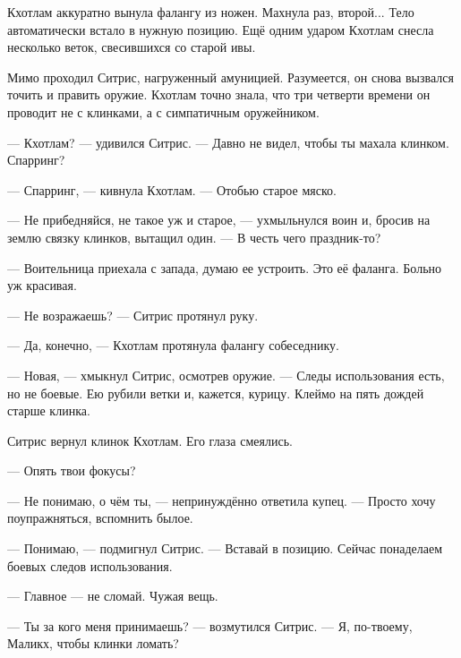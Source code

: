 \documentclass[a4paper,10pt,fleqn]{book}\usepackage{cooltooltips}\usepackage{polyglossia}\setdefaultlanguage{english}\setotherlanguage{russian}\defaultfontfeatures{Ligatures=TeX,Mapping=tex-text} \usepackage{xcolor}\definecolor{lightgray}{HTML}{bbbbbb}\color{lightgray}\newcommand{\ml}[3]{\textcolor{black}{#3}}
\newcommand{\asterism}{\vspace{1em}{\centering\Large\bfseries$\ast~\ast~\ast$\par}\vspace{1em}}
\begin{document}
\asterism

Кхотлам аккуратно вынула фалангу из ножен.
Махнула раз, второй...
Тело автоматически встало в нужную позицию.
Ещё одним ударом Кхотлам снесла несколько веток, свесившихся со старой ивы.

Мимо проходил Ситрис, нагруженный амуницией.
Разумеется, он снова вызвался точить и править оружие.
Кхотлам точно знала, что три четверти времени он проводит не с клинками, а с симпатичным оружейником.

--- Кхотлам? --- удивился Ситрис.
--- Давно не видел, чтобы ты махала клинком.
Спарринг?

--- Спарринг, — кивнула Кхотлам.
--- Отобью старое мяско.

--- Не прибедняйся, не такое уж и старое, --- ухмыльнулся воин и, бросив на землю связку клинков, вытащил один.
--- В честь чего праздник-то?

--- Воительница приехала с запада, думаю ее устроить.
Это её фаланга.
Больно уж красивая.

--- Не возражаешь? --- Ситрис протянул руку.

--- Да, конечно, --- Кхотлам протянула фалангу собеседнику.

--- Новая, --- хмыкнул Ситрис, осмотрев оружие.
--- Следы использования есть, но не боевые.
Ею рубили ветки и, кажется, курицу.
Клеймо на пять дождей старше клинка.

Ситрис вернул клинок Кхотлам.
Его глаза смеялись.

--- Опять твои фокусы?

--- Не понимаю, о чём ты, --- непринуждённо ответила купец.
--- Просто хочу поупражняться, вспомнить былое.

--- Понимаю, --- подмигнул Ситрис. 
--- Вставай в позицию.
Сейчас понаделаем боевых следов использования.

--- Главное --- не сломай.
Чужая вещь.

--- Ты за кого меня принимаешь? --- возмутился Ситрис.
--- Я, по-твоему, Маликх, чтобы клинки ломать?
\end{document}
